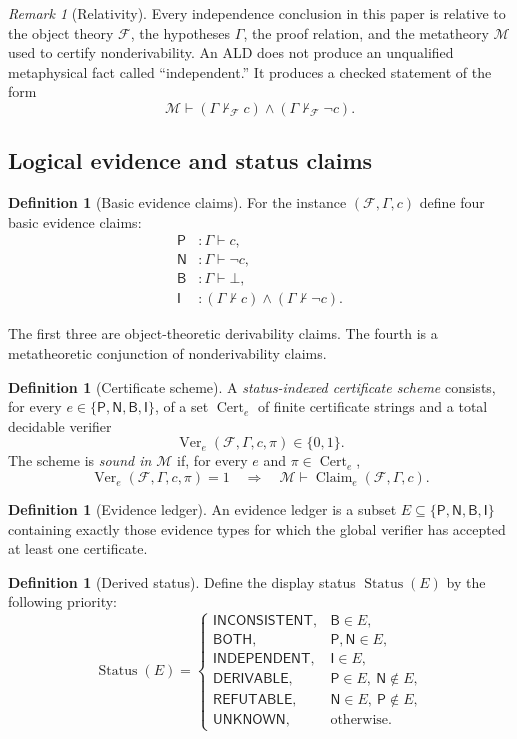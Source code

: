 \documentclass[11pt]{article}
\theoremstyle{definition}
\newtheorem{definition}[theorem]{Definition}
\theoremstyle{remark}
\newtheorem{remark}[theorem]{Remark}
\newcommand{\Cert}{\operatorname{Cert}}
\newcommand{\Ver}{\operatorname{Ver}}
\newcommand{\Status}{\operatorname{Status}}
\newcommand{\Unknown}{\mathsf{UNKNOWN}}
\newcommand{\Der}{\mathsf{DERIVABLE}}
\newcommand{\Refut}{\mathsf{REFUTABLE}}
\newcommand{\Both}{\mathsf{BOTH}}
\newcommand{\Ind}{\mathsf{INDEPENDENT}}
\newcommand{\Inc}{\mathsf{INCONSISTENT}}
\newcommand{\Plus}{\mathsf{P}}
\newcommand{\Minus}{\mathsf{N}}
\newcommand{\BotEv}{\mathsf{B}}
\newcommand{\IndEv}{\mathsf{I}}
\newcommand{\M}{\mathcal M}
\newcommand{\F}{\mathcal F}
\newcommand{\Gammaa}{\Gamma}
\newcommand{\bottomf}{\bot}
\begin{document}
\begin{remark}[Relativity]
Every independence conclusion in this paper is relative to the object theory $\F$, the hypotheses $\Gammaa$, the proof relation, and the metatheory $\M$ used to certify nonderivability. An ALD does not produce an unqualified metaphysical fact called ``independent.'' It produces a checked statement of the form
\[
\M\vdash (\Gammaa\nvdash_{\F}c)\wedge(\Gammaa\nvdash_{\F}\neg c).
\]
\end{remark}

\subsection{Logical evidence and status claims}
\begin{definition}[Basic evidence claims]
For the instance $(\F,\Gammaa,c)$ define four basic evidence claims:
\begin{align*}
\Plus &: \Gammaa\vdash c,\\
\Minus &: \Gammaa\vdash\neg c,\\
\BotEv &: \Gammaa\vdash\bottomf,\\
\IndEv &: (\Gammaa\nvdash c)\wedge(\Gammaa\nvdash\neg c).
\end{align*}
\end{definition}

The first three are object-theoretic derivability claims. The fourth is a metatheoretic conjunction of nonderivability claims.

\begin{definition}[Certificate scheme]
A \emph{status-indexed certificate scheme} consists, for every $e\in\{\Plus,\Minus,\BotEv,\IndEv\}$, of a set $\Cert_e$ of finite certificate strings and a total decidable verifier
\[
\Ver_e(\F,\Gammaa,c,\pi)\in\{0,1\}.
\]
The scheme is \emph{sound in $\M$} if, for every $e$ and $\pi\in\Cert_e$,
\[
\Ver_e(\F,\Gammaa,c,\pi)=1
\quad\Longrightarrow\quad
\M\vdash \operatorname{Claim}_e(\F,\Gammaa,c).
\]
\end{definition}

\begin{definition}[Evidence ledger]
An evidence ledger is a subset $E\subseteq\{\Plus,\Minus,\BotEv,\IndEv\}$ containing exactly those evidence types for which the global verifier has accepted at least one certificate.
\end{definition}

\begin{definition}[Derived status]
Define the display status $\Status(E)$ by the following priority:
\[
\Status(E)=
\begin{cases}
\Inc, & \BotEv\in E,\\
\Both, & \Plus,\Minus\in E,\\
\Ind, & \IndEv\in E,\\
\Der, & \Plus\in E,\ \Minus\notin E,\\
\Refut, & \Minus\in E,\ \Plus\notin E,\\
\Unknown, & \text{otherwise.}
\end{cases}
\]
\end{definition}
\end{document}
